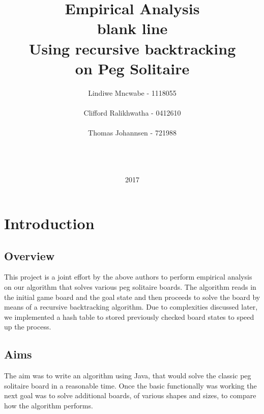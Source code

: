 \documentclass[11pt]{article}
\title{%
\Huge Empirical Analysis\\
\color{white} blank line\\
\color{black}
\Large
Using recursive backtracking\\
on Peg Solitaire}
\date{2017}
\author{Lindiwe Mncwabe - 1118055\\\\Clifford Ralikhwatha - 0412610\\\\Thomas Johannsen - 721988\\\\\\\\}
\begin{document}
\maketitle
{}
\newpage
\tableofcontents
\listoffigures
\newpage
{}
\section{Introduction}
\subsection{Overview}
This project is a joint effort by the above authors to perform empirical analysis on our algorithm that solves various peg solitaire boards. The algorithm reads in the initial game board and the goal state and then proceeds to solve the board by means of a recursive backtracking algorithm. Due to complexities discussed later, we implemented a hash table to stored previously checked board states to speed up the process.
\subsection{Aims}
The aim was to write an algorithm using Java, that would solve the classic peg\\ solitaire board in a reasonable time. Once the basic functionally was working the next goal was to solve additional boards, of various shapes and sizes, to compare how the algorithm performs.\\
\newpage
\end{document}
